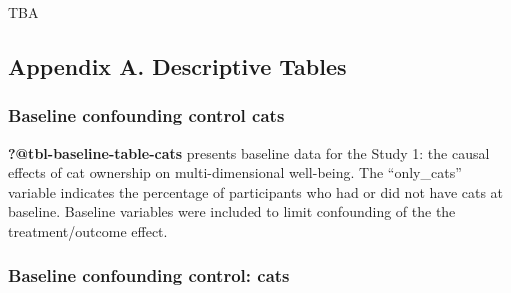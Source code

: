 \documentclass[
  singlecolumn,
  9pt]{article}
\begin{document}
TBA

\newpage{}

\subsection{Appendix A. Descriptive
Tables}\label{appendix-a.-descriptive-tables}

\subsubsection{Baseline confounding control
cats}\label{baseline-confounding-control-cats}

\textbf{?@tbl-baseline-table-cats} presents baseline data for the Study
1: the causal effects of cat ownership on multi-dimensional well-being.
The ``only\_cats'' variable indicates the percentage of participants who
had or did not have cats at baseline. Baseline variables were included
to limit confounding of the the treatment/outcome effect.

\newpage{}

\subsubsection{Baseline confounding control:
cats}\label{baseline-confounding-control-cats-1}
\end{document}

